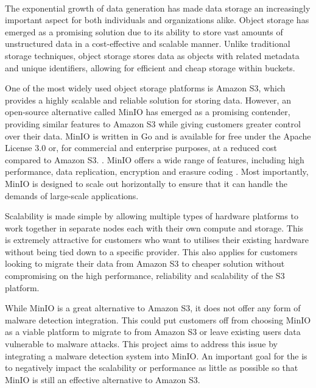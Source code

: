 \documentclass[12pt, conference, final, a4paper, onecolumn, compsoc]{IEEEtran}
\begin{document}
\paragraph{}
The exponential growth of data generation has made data storage an increasingly
important aspect for both individuals and organizations alike. Object storage
has emerged as a promising solution due to its ability to store vast amounts of
unstructured data in a cost-effective and scalable manner. Unlike traditional
storage techniques, object storage stores data as objects with related metadata
and unique identifiers, allowing for efficient and cheap storage within buckets.


One of the most widely used object storage platforms is Amazon S3, which
provides a highly scalable and reliable solution for storing data. However, an
open-source alternative called MinIO has emerged as a promising contender,
providing similar features to Amazon S3 while giving customers greater control
over their data. MinIO is written in Go and is available for free under the
Apache License 3.0 or, for commercial and enterprise purposes, at a reduced cost
compared to Amazon S3. \citep{minio-pricing}. MinIO offers a wide range of
features, including high performance, data replication, encryption and erasure
coding \citep{minio}. Most importantly, MinIO is designed to scale out
horizontally to ensure that it can handle the demands of large-scale
applications.

Scalability is made simple by allowing multiple types of hardware platforms to
work together in separate nodes each with their own compute and storage. This is
extremely attractive for customers who want to utilises their existing hardware
without being tied down to a specific provider. This also applies for customers
looking to migrate their data from Amazon S3 to cheaper solution without
compromising on the high performance, reliability and scalability of the S3
platform.

While MinIO is a great alternative to Amazon S3, it does not offer any form of
malware detection integration. This could put customers off from choosing MinIO
as a viable platform to migrate to from Amazon S3 or leave existing users data
vulnerable to malware attacks. This project aims to address this issue by
integrating a malware detection system into MinIO. An important goal for the is
to negatively impact the scalability or performance as little as possible so
that MinIO is still an effective alternative to Amazon S3.
\end{document}
